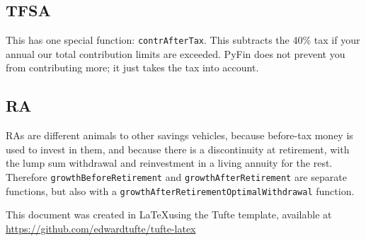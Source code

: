 \documentclass[a4paper, justified]{tufte-handout}
\begin{document}
\subsection{TFSA} This has one special function: \texttt{contrAfterTax}. This subtracts the 40\% tax if your annual our total contribution limits are exceeded. PyFin does not prevent you from contributing more; it just takes the tax into account. 

\subsection{RA} RAs are different animals to other savings vehicles, because before-tax money is used to invest in them, and because there is a discontinuity at retirement, with the lump sum withdrawal and reinvestment in a living annuity for the rest. Therefore \texttt{growthBeforeRetirement} and \texttt{growthAfterRetirement} are separate functions, but also with a \texttt{growthAfterRetirementOptimalWithdrawal} function. 

\bigskip
This document was created in \LaTeX using the Tufte template, available at \url{https://github.com/edwardtufte/tufte-latex}







%
%
\end{document}
